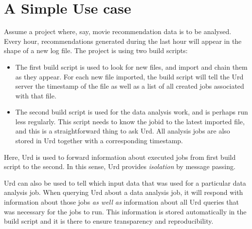\section{A Simple Use case}

Assume a project where, say, movie recommendation data is to be
analysed.  Every hour, recommendations generated during the last hour
will appear in the shape of a new log file.  The project is using two
build scripts:
\begin{itemize}
\item[] The first build script is used to look for new files, and import and chain
  them as they appear.  For each new file imported, the build script
  will tell the Urd server the timestamp of the file as well as a list
  of all created jobs associated with that file.

\item[] The second build script is used for the data analysis work, and is perhaps run less regularly.
  This script needs to know the jobid to the latest imported file, and
  this is a straightforward thing to ask Urd.  All analysis jobs are
  also stored in Urd together with a corresponding timestamp.
\end{itemize}
Here, Urd is used to forward information about executed jobs from
first build script to the second.  In this sense, Urd
provides \textsl{isolation} by message passing.

Urd can also be used to tell which input data that was used for a
particular data analysis job.  When querying Urd about a data analysis
job, it will respond with information about those jobs \textsl{as well
as} information about all Urd queries that was necessary for the jobs
to run.  This information is stored automatically in the build script
and it is there to ensure transparency and reproducibility.









